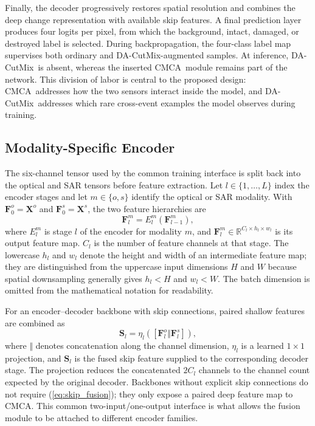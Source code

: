 \documentclass[journal]{IEEEtran}
\newcommand{\cmca}{CMCA}
\newcommand{\dacutmix}{DA-CutMix}
\begin{document}
    Finally, the decoder progressively restores spatial resolution and combines the deep change representation with available skip features. A final prediction layer produces four logits per pixel, from which the background, intact, damaged, or destroyed label is selected. During backpropagation, the four-class label map supervises both ordinary and \dacutmix-augmented samples. At inference, \dacutmix\ is absent, whereas the inserted \cmca\ module remains part of the network. This division of labor is central to the proposed design: \cmca\ addresses how the two sensors interact inside the model, and \dacutmix\ addresses which rare cross-event examples the model observes during training.
    
    \subsection{Modality-Specific Encoder}
    \label{subsec:encoder}
    
    The six-channel tensor used by the common training interface is split back into the optical and SAR tensors before feature extraction. Let $l\in\{1,\ldots,L\}$ index the encoder stages and let $m\in\{o,s\}$ identify the optical or SAR modality. With $\mathbf{F}^{o}_{0}=\mathbf{X}^{o}$ and $\mathbf{F}^{s}_{0}=\mathbf{X}^{s}$, the two feature hierarchies are
    \begin{equation}
        \mathbf{F}^{m}_{l}
        =E^{m}_{l}\!\left(\mathbf{F}^{m}_{l-1}\right),
        \label{eq:dual_encoder}
    \end{equation}
    where $E^{m}_{l}$ is stage $l$ of the encoder for modality $m$, and
    $\mathbf{F}^{m}_{l}\in\mathbb{R}^{C_l\times h_l\times w_l}$ is its output feature map. $C_l$ is the number of feature channels at that stage. The lowercase $h_l$ and $w_l$ denote the height and width of an intermediate feature map; they are distinguished from the uppercase input dimensions $H$ and $W$ because spatial downsampling generally gives $h_l<H$ and $w_l<W$. The batch dimension is omitted from the mathematical notation for readability.
    
    For an encoder--decoder backbone with skip connections, paired shallow features are combined as
    \begin{equation}
        \mathbf{S}_{l}
        =\eta_l\!\left(
        [\mathbf{F}^{o}_{l}\Vert\mathbf{F}^{s}_{l}]
        \right),
        \label{eq:skip_fusion}
    \end{equation}
    where $\Vert$ denotes concatenation along the channel dimension, $\eta_l$ is a learned $1\times1$ projection, and $\mathbf{S}_l$ is the fused skip feature supplied to the corresponding decoder stage. The projection reduces the concatenated $2C_l$ channels to the channel count expected by the original decoder. Backbones without explicit skip connections do not require (\ref{eq:skip_fusion}); they only expose a paired deep feature map to \cmca. This common two-input/one-output interface is what allows the fusion module to be attached to different encoder families.
    
\end{document}
